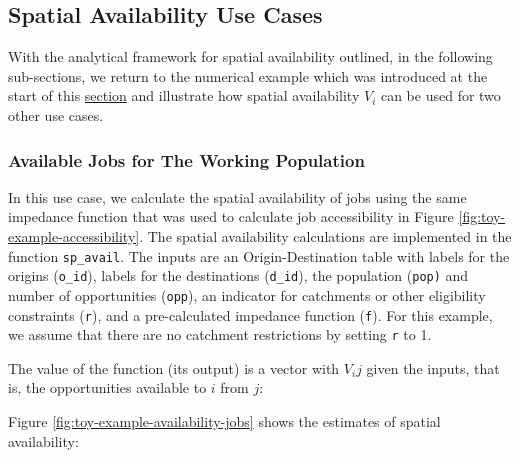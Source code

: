 \documentclass[]{elsarticle} %
\begin{document}
\hypertarget{spatial-availability-use-cases}{%
\subsection{Spatial Availability Use
Cases}\label{spatial-availability-use-cases}}

With the analytical framework for spatial availability outlined, in the
following sub-sections, we return to the numerical example which was
introduced at the start of this
\protect\hyperlink{accessibility-numerical-example}{section} and
illustrate how spatial availability \(V_i\) can be used for two other
use cases.

\hypertarget{available-jobs-for-the-working-population}{%
\subsubsection{Available Jobs for The Working
Population}\label{available-jobs-for-the-working-population}}

In this use case, we calculate the spatial availability of jobs using
the same impedance function that was used to calculate job accessibility
in Figure \ref{fig:toy-example-accessibility}. The spatial availability
calculations are implemented in the function \texttt{sp\_avail}. The
inputs are an Origin-Destination table with labels for the origins
(\texttt{o\_id}), labels for the destinations (\texttt{d\_id}), the
population (\texttt{pop)} and number of opportunities (\texttt{opp}), an
indicator for catchments or other eligibility constraints (\texttt{r}),
and a pre-calculated impedance function (\texttt{f}). For this example,
we assume that there are no catchment restrictions by setting \texttt{r}
to 1.

The value of the function (its output) is a vector with \(V_ij\) given
the inputs, that is, the opportunities available to \(i\) from \(j\):

Figure \ref{fig:toy-example-availability-jobs} shows the estimates of
spatial availability:
\end{document}
